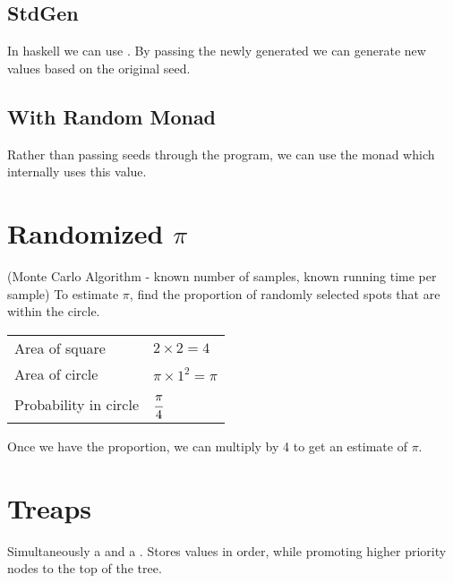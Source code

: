 \documentclass{report}
\begin{document}
        \subsection*{StdGen}
            In haskell we can use .
            By passing the newly generated  we can generate new values based on the original seed.

        \subsection*{With Random Monad}
            Rather than passing  seeds through the program, we can use the  monad which internally uses this value.

        
    \section*{Randomized $\pi$}
        (Monte Carlo Algorithm - known number of samples, known running time per sample) To estimate $\pi$, find the proportion of randomly selected spots that are within the circle.
        \begin{center}
            \begin{tabular}{l l}
                Area of square & $2 \times 2 = 4$ \\
                Area of circle & $\pi \times 1^2 = \pi$ \\
                Probability in circle & $\cfrac{\pi}{4}$ \\
            \end{tabular}
        \end{center}
        Once we have the proportion, we can multiply by 4 to get an estimate of $\pi$.

    \section*{Treaps}
        Simultaneously a  and a . Stores values in order, while promoting higher priority nodes to the top of the tree.
\end{document}
